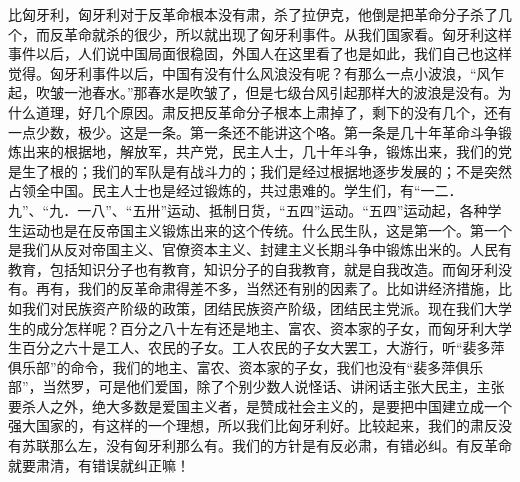 比匈牙利，匈牙利对于反革命根本没有肃，杀了拉伊克，他倒是把革命分子杀了几个，而反革命就杀的很少，所以就出现了匈牙利事件。从我们国家看。匈牙利这样事件以后，人们说中国局面很稳固，外国人在这里看了也是如此，我们自己也这样觉得。匈牙利事件以后，中国有没有什么风浪没有呢？有那么一点小波浪，“风乍起，吹皱一池春水。”那春水是吹皱了，但是七级台风引起那样大的波浪是没有。为什么道理，好几个原因。肃反把反革命分子根本上肃掉了，剩下的没有几个，还有一点少数，极少。这是一条。第一条还不能讲这个咯。第一条是几十年革命斗争锻炼出来的根据地，解放军，共产党，民主人士，几十年斗争，锻炼出来，我们的党是生了根的；我们的军队是有战斗力的；我们是经过根据地逐步发展的；不是突然占领全中国。民主人士也是经过锻炼的，共过患难的。学生们，有“一二．九”、“九．一八”、“五卅”运动、抵制日货，“五四”运动。“五四”运动起，各种学生运动也是在反帝国主义锻炼出来的这个传统。什么民生队，这是第一个。第一个是我们从反对帝国主义、官僚资本主义、封建主义长期斗争中锻炼出米的。人民有教育，包括知识分子也有教育，知识分子的自我教育，就是自我改造。而匈牙利没有。再有，我们的反革命肃得差不多，当然还有别的因素了。比如讲经济措施，比如我们对民族资产阶级的政策，团结民族资产阶级，团结民主党派。现在我们大学生的成分怎样呢？百分之八十左有还是地主、富农、资本家的子女，而匈牙利大学生百分之六十是工人、农民的子女。工人农民的子女大罢工，大游行，听“裴多萍俱乐部”的命令，我们的地主、富农、资本家的子女，我们也没有“裴多萍俱乐部”，当然罗，可是他们爱国，除了个别少数人说怪话、讲闲话主张大民主，主张要杀人之外，绝大多数是爱国主义者，是赞成社会主义的，是要把中国建立成一个强大国家的，有这样的一个理想，所以我们比匈牙利好。比较起来，我们的肃反没有苏联那么左，没有匈牙利那么有。我们的方针是有反必肃，有错必纠。有反革命就要肃清，有错误就纠正嘛！

